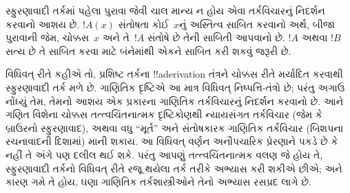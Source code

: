 \documentclass[../../../include/open-logic-chapter]{subfiles}
\begin{document}
સ્ફુરણાવાદી તર્કમાં પહેલા પુરાવા જેવી ચાલ માન્ય ન હોય એવા
તર્કવિચારનું નિદર્શન કરવાનો આશય છે. $!A(x)$ સંતોષતા કોઈ~$x$નું
અસ્તિત્વ સાબિત કરવાનો અર્થ, બીજા પુરાવાની જેમ, ચોક્કસ~$x$
અને તે~$!A$ સંતોષે છે તેની સાબિતી આપવાનો છે. $!A$ અથવા
$!B$ સત્ય છે તે સાબિત કરવા માટે બંનેમાંથી એકને સાબિત કરી
શકવું જરૂરી છે.

વિધિવત્ રીતે કહીએ તો, પ્રશિષ્ટ તર્કના !!a{derivation} તંત્રને
ચોક્કસ રીતે મર્યાદિત કરવાથી સ્ફુરણાવાદી તર્ક મળે છે. ગાણિતિક
દૃષ્ટિએ આ માત્ર વિધિવત્ નિષ્પત્તિ-તંત્રો છે; પરંતુ અગાઉ
નોંધ્યું તેમ, તેમનો આશય એક પ્રકારના ગાણિતિક તર્કવિચારનું
નિદર્શન કરવાનો છે. આને ગણિત વિશેના ચોક્કસ તત્ત્વચિંતનાત્મક
દૃષ્ટિકોણથી ન્યાયસંગત તર્કવિચાર (જેમ કે બ્રાઉરનો સ્ફુરણાવાદ),
અથવા વધુ ``મૂર્ત'' અને સંતોષકારક ગાણિતિક તર્કવિચાર (બિશપના
રચનાવાદની દિશામાં) માની શકાય. આ વિધિવત્ વર્ણન અનૌપચારિક
પ્રેરણાને પકડે છે કે નહીં તે અંગે પણ દલીલ થઈ શકે. પરંતુ
આપણું તત્ત્વચિંતનાત્મક વલણ જે હોય તે, સ્ફુરણાવાદી તર્કનો
વિધિવત્ રીતે રજૂ થયેલા તર્ક તરીકે અભ્યાસ કરી શકીએ છીએ;
અને કારણ ગમે તે હોય, ઘણા ગાણિતિક તર્કશાસ્ત્રીઓને તેનો
અભ્યાસ રસપ્રદ લાગે છે.
\end{document}
